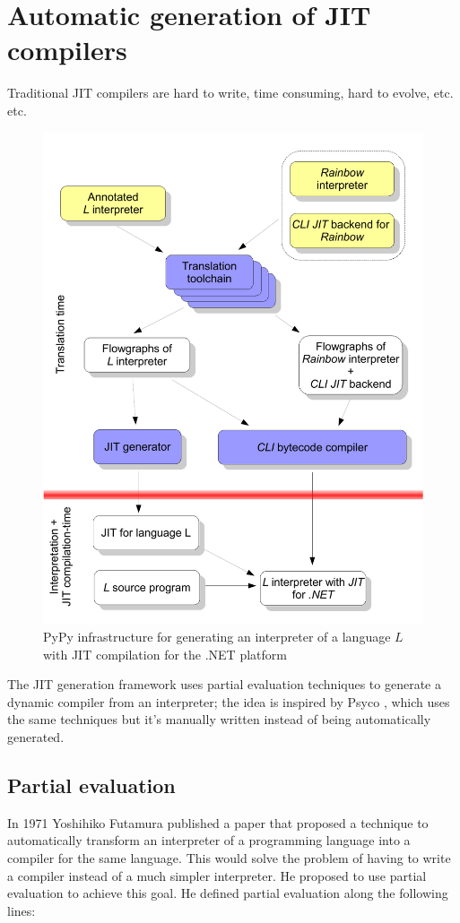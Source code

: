 \section{Automatic generation of JIT compilers}

Traditional JIT compilers are hard to write, time consuming, hard to evolve,
etc. etc.

\begin{figure}[h]
\begin{center}
\includegraphics[width=.6\textwidth]{diagram1}
\caption{PyPy infrastructure for generating an interpreter of a
  language $L$ with JIT compilation for the .NET platform}
\end{center}
\end{figure}

The JIT generation framework uses partial evaluation techniques to generate a
dynamic compiler from an interpreter; the idea is inspired by Psyco \cite{DBLP:conf/pepm/Rigo04}, which
uses the same techniques but it's manually written instead of being
automatically generated.

\subsection{Partial evaluation}

In 1971 Yoshihiko Futamura published a paper \cite{Futamura99} that proposed a
technique to automatically transform an interpreter of a programming language
into a compiler for the same language. This would solve the problem of having to
write a compiler instead of a much simpler interpreter. He proposed to use
partial evaluation to achieve this goal. He defined partial evaluation along the following lines:

